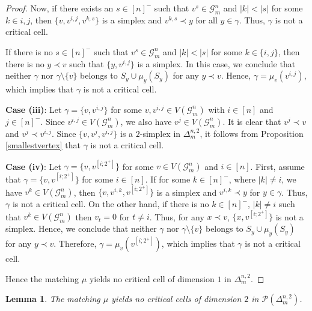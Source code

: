 \documentclass{amsart}
\newtheorem{lemma}[theorem]{Lemma}
\theoremstyle{definition}
\theoremstyle{remark}
\numberwithin{equation}{section}
\newcommand{\D}{\Delta}
\newcommand{\G}{\mathcal{G}}
\newcommand{\cP}{\mathcal{P}}
\begin{document}
\begin{proof}
Now, if there exists an $s \in [n]^{-}$ such that $v^s \in \G_m^n$ and $|k| < |s|$ for some $k \in {i, j}$, then $\{v, v^{i,j}, v^{k,s}\}$ is a simplex and $v^{k,s} \prec y$ for all $y \in \gamma$. Thus, $\gamma$ is not a critical cell.

If there is no $s \in [n]^{-}$ such that $v^s \in \G_m^n$ and $|k| < |s|$ for some $k \in \{i, j\}$, then there is no $y \prec v$ such that $\{y,v^{i,j}\}$ is a simplex. In this case, we conclude that neither $\gamma$ nor $\gamma \setminus \{v\}$ belongs to $S_y \cup \mu_y(S_y)$ for any $y \prec v$. Hence, $\gamma = \mu_v(v^{i,j})$, which implies that $\gamma$ is not a critical cell.

    \vspace{.1cm}
	\noindent
	\textbf{Case (iii)}: Let $\gamma = \{v,v^{i,j}\}$ for some $v,v^{i,j} \in V(\G_m^n)$ with $i \in [n]$ and $j \in [n]^{-}$. Since $v^{i,j} \in V(\G_m^n)$, we also have $v^{j} \in V(\G_m^n)$. It is clear that $v^{j} \prec v$ and $v^{j} \prec v^{i,j}$. Since $\{v, v^{j}, v^{i,j}\}$ is a $2$-simplex in $\D_m^{n,2}$, it follows from Proposition \ref{smallestvertex} that $\gamma$ is not a critical cell.


    \vspace{.1cm}
	\noindent\textbf{Case (iv)}: Let $\gamma = \{v,v^{[i;2^{+}]}\}$ for some $v \in V(\G_m^n)$ and $i \in [n]$. First, assume that $\gamma = \{v,v^{[i;2^{+}]}\}$ for some $i \in [n]$. If for some  $k\in [n]^{-}$, where $|k|\neq i$, we have $v^k\in V(\G_m^n)$, then $\{v,v^{i,k},v^{[i;2^{+}]}\}$ is a simplex and $v^{i,k}\prec y$ for $y\in\gamma$. Thus, $\gamma$ is not a critical cell. On the other hand, if there is no $k\in [n]^{-}$, $|k|\neq i$ such that $v^k\in V(\G_m^n)$ then $v_t=0$ for $t\neq i$. Thus,  for any $x\prec v$, $\{x,v^{[i;2^{+}]}\}$ is not a simplex. Hence, we conclude that neither $\gamma$ nor $\gamma \setminus \{v\}$ belongs to $S_y \cup \mu_y(S_y)$ for any $y \prec v$. Therefore, $\gamma = \mu_v(v^{[i;2^{+}]})$, which implies that $\gamma$ is not a critical cell.

    \vspace{.1cm}
    
	Hence the matching $\mu$ yields no critical cell of dimension $1$ in $\D_m^{n,2}$.
\end{proof}


\begin{lemma}\label{lemma:critical_2}
	The matching $\mu$ yields no critical cells of dimension $2$ in $\cP(\D_m^{n,2})$.
\end{lemma}
\end{document}
